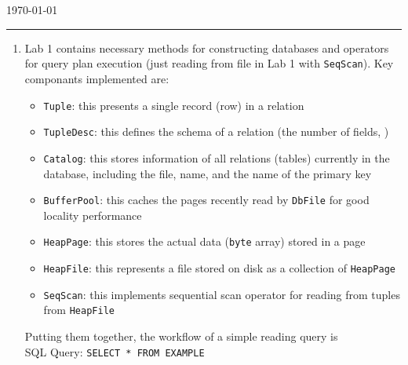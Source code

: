 \documentclass[10pt]{myland}
\begin{document}
\begin{center}
	{\Large \myhwname} \\
	\vspace{.05in}
    \myname\quad\quarter \\
	\vspace{.05in}
    \today \\
\end{center}
\vspace{.15in} \hrule \vspace{0.5em}%

\begin{enumerate}[label=\textbf{\arabic*.}, listparindent=0.0em, itemsep=1em]
	\item
	Lab 1 contains necessary methods for constructing databases and operators for query plan execution (just reading
	from file in Lab 1 with \texttt{SeqScan}). Key componants implemented are:
	\begin{itemize}
		\item \texttt{Tuple}: this presents a single record (row) in a relation
		\item \texttt{TupleDesc}: this defines the schema of a relation (the number of fields, )
		\item \texttt{Catalog}: this stores information of all relations (tables) currently in the database, including the file, name, and the name of the primary key
		\item \texttt{BufferPool}: this caches the pages recently read by \texttt{DbFile} for good locality performance
		\item \texttt{HeapPage}: this stores the actual data (\texttt{byte} array) stored in a page
		\item \texttt{HeapFile}: this represents a file stored on disk as a collection of \texttt{HeapPage}
		\item \texttt{SeqScan}: this implements sequential scan operator for reading from tuples from \texttt{HeapFile}
	\end{itemize}
    Putting them together, the workflow of a simple reading query is \\
    SQL Query: \texttt{SELECT * FROM EXAMPLE} \\


\end{enumerate}
\end{document}
